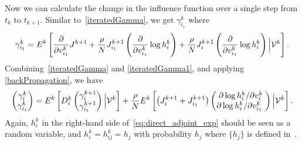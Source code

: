 \documentclass[12pt,nopreprintline]{elsarticle}
\begin{document}
Now we can calculate the change in the influence function over a single step from $t_k$ to $t_{k+1}$. Similar to~\eqref{iteratedGamma}, we get $\gamma_{i_1}^k$ where
\begin{equation}
\gamma_{i_1}^k =  E^k \left[ \frac{\partial}{\partial v_{i_1}^k}  J^{k+1} + \frac{\rho}{N} J^{k+1}_{i_1} \left(\frac{\partial}{\partial v_{i_1}^k}\log h^k_i \right)  + \frac{\rho}{N} J^{k+1}_{i} \left(\frac{\partial}{\partial v_{i_1}^k}\log h^k_i \right) \Big| {\cal V}^k  \right]. \label{iteratedGamma1}
\end{equation}
Combining~\eqref{iteratedGamma} and \eqref{iteratedGamma1}, and applying \eqref{backPropagation}, we have
\begin{equation}\label{eq:direct_adjoint_exp}
    \begin{pmatrix}
    \gamma_i^k\\
    \gamma_{i_1}^k
    \end{pmatrix}
     = E^k\left[ D_i^k  \begin{pmatrix}
    \gamma_i^{k+1}\\
    \gamma_{i_1}^{k+1}
    \end{pmatrix}  \Big| {\cal V}^k \right]   + \frac{\rho}{N} E^k\left[ \left( J_{i}^{k+1} + J_{i_1}^{k+1} \right) \begin{pmatrix}
    \partial \log h_i^k /\partial v_i^k\\
    \partial \log h_i^k /\partial v_{i_1}^k\
    \end{pmatrix}  \Big| {\cal V}^k \right].
\end{equation}
Again, $h_i^k$ in the right-hand side of~\eqref{eq:direct_adjoint_exp} should be seen as a random variable, and $h_i^k = h_{ij}^k =  h_j$ with probability $h_j$ where $\{h_j\}$ is defined in~. 



\end{document}
